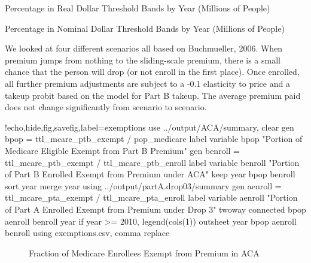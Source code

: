 \documentclass{article}
\begin{document}
\begin{table}[ht]
\centering
\caption{Percentage in Real Dollar Threshold Bands by Year (Millions of People)}
\label{tab:income_pops_real}
\end{table}

\begin{table}[ht]
\centering
\caption{Percentage in Nominal Dollar Threshold Bands by Year (Millions of People)}
\label{tab:income_pops_nominal}
\end{table}

We looked at four different scenarios all based on Buchmueller, 2006. When premium jumps from nothing to the sliding-scale premium, there is a small chance that the person will drop (or not enroll in the first place). Once enrolled, all further premium adjustments are subject to a -0.1 elasticity to price and a takeup probit based on the model for Part B takeup. The average premium paid does not change significantly from scenario to scenario. 

\begin{Statacode}{!echo,hide,fig,savefig,label=exemptions}
use ../output/ACA/summary, clear
gen bpop = ttl_mcare_ptb_exempt / pop_medicare
label variable bpop "Portion of Medicare Eligible Exempt from Part B Premium"
gen benroll = ttl_mcare_ptb_exempt / ttl_mcare_ptb_enroll
label variable benroll "Portion of Part B Enrolled Exempt from Premium under ACA"
keep year bpop benroll
sort year
merge year using ../output/partA.drop03/summary
gen aenroll = ttl_mcare_pta_exempt / ttl_mcare_pta_enroll
label variable aenroll "Portion of Part A Enrolled Exempt from Premium under Drop 3"
twoway connected bpop aenroll benroll year if year >= 2010, legend(cols(1))
outsheet year bpop aenroll benroll using exemptions.csv, comma replace
\end{Statacode}

\begin{figure}[ht]
\centering
{}
\caption{Fraction of Medicare Enrollees Exempt from Premium in ACA}
\label{fig:exemptions}
\end{figure}
\end{document}
